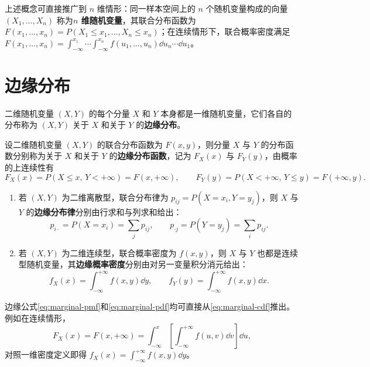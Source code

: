 上述概念可直接推广到 $n$ 维情形：同一样本空间上的 $n$ 个随机变量构成的向量 $(X_1,\ldots,X_n)$ 称为\textbf{$n$ 维随机变量}，其联合分布函数为 $F(x_1,\ldots,x_n)=P(X_1\le x_1,\ldots,X_n\le x_n)$；在连续情形下，联合概率密度满足 $F(x_1,\ldots,x_n)=\int_{-\infty}^{x_1}\cdots\int_{-\infty}^{x_n}f(u_1,\ldots,u_n)\dd u_n\cdots\dd u_1$。

\section{边缘分布}
\label{sec:marginal-distribution}

二维随机变量 $(X,Y)$ 的每个分量 $X$ 和 $Y$ 本身都是一维随机变量，它们各自的分布称为 $(X,Y)$ 关于 $X$ 和关于 $Y$ 的\textbf{边缘分布}。

\begin{definition}
\label{def:marginal-distribution}
设二维随机变量 $(X,Y)$ 的联合分布函数为 $F(x,y)$，则分量 $X$ 与 $Y$ 的分布函数分别称为关于 $X$ 和关于 $Y$ 的\textbf{边缘分布函数}，记为 $F_X(x)$ 与 $F_Y(y)$，由概率的上连续性有
\begin{equation}
  F_X(x)=P(X\le x,\,Y<+\infty)=F(x,+\infty),\qquad
  F_Y(y)=P(X<+\infty,\,Y\le y)=F(+\infty,y).
  \label{eq:marginal-cdf}
\end{equation}
\begin{enumerate}
  \item 若 $(X,Y)$ 为二维离散型，联合分布律为 $p_{ij}=P(X=x_i,Y=y_j)$，则 $X$ 与 $Y$ 的\textbf{边缘分布律}分别由行求和与列求和给出：
  \begin{equation}
    p_{i\cdot}=P(X=x_i)=\sum_{j}p_{ij},\qquad
    p_{\cdot j}=P(Y=y_j)=\sum_{i}p_{ij}.
    \label{eq:marginal-pmf}
  \end{equation}
  \item 若 $(X,Y)$ 为二维连续型，联合概率密度为 $f(x,y)$，则 $X$ 与 $Y$ 也都是连续型随机变量，其\textbf{边缘概率密度}分别由对另一变量积分消元给出：
  \begin{equation}
    f_X(x)=\int_{-\infty}^{+\infty}f(x,y)\dd y,\qquad
    f_Y(y)=\int_{-\infty}^{+\infty}f(x,y)\dd x.
    \label{eq:marginal-pdf}
  \end{equation}
\end{enumerate}
\end{definition}

边缘公式\eqref{eq:marginal-pmf}和\eqref{eq:marginal-pdf}均可直接从\eqref{eq:marginal-cdf}推出。例如在连续情形，
\[
  F_X(x)=F(x,+\infty)=\int_{-\infty}^{x}\left[\int_{-\infty}^{+\infty}f(u,v)\dd v\right]\dd u,
\]
对照一维密度定义即得 $f_X(x)=\int_{-\infty}^{+\infty}f(x,y)\dd y$。

